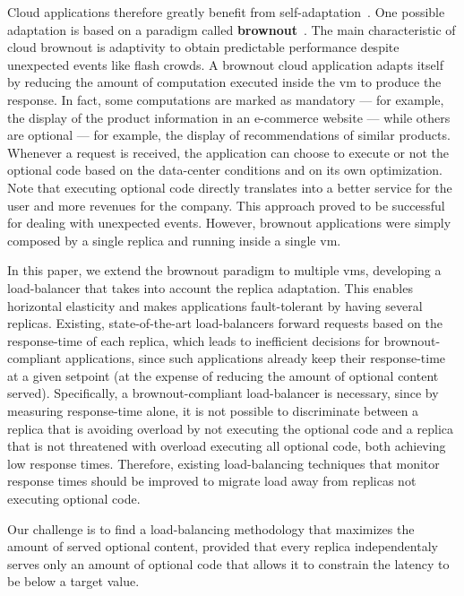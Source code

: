 Cloud applications therefore greatly benefit from
self-adaptation~\cite{SalehieSelfadaptive:TAAS}. One possible
adaptation is based on a paradigm called {\bf
  brownout}~\citep{cloudish-tr}. The main characteristic of cloud
brownout is adaptivity to obtain predictable performance despite
unexpected events like flash crowds. A brownout cloud application
adapts itself by reducing the amount of computation executed inside
the \ac{vm} to produce the response. In fact, some computations are
marked as mandatory --- for example, the display of the product
information in an e-commerce website --- while others are optional ---
for example, the display of recommendations of similar products.
Whenever a request is received, the application can choose to execute
or not the optional code based on the data-center conditions and on
its own optimization. Note that executing optional code directly
translates into a better service for the user and more revenues for
the company. This approach proved to be successful for dealing with
unexpected events. However, brownout applications were simply composed
by a single replica and running inside a single \ac{vm}.

In this paper, we extend the brownout paradigm to multiple \acp{vm},
developing a load-balancer that takes into account the replica
adaptation. This enables horizontal elasticity and makes applications
fault-tolerant by having several replicas. Existing, state-of-the-art
load-balancers forward requests based on the response-time of each
replica, which leads to inefficient decisions for brownout-compliant
applications, since such applications already keep their response-time
at a given setpoint (at the expense of reducing the amount of optional
content served). Specifically, a brownout-compliant load-balancer is
necessary, since by measuring response-time alone, it is not possible
to discriminate between a replica that is avoiding overload by not
executing the optional code and a replica that is not threatened with
overload executing all optional code, both achieving low response
times.  Therefore, existing load-balancing techniques that monitor
response times should be improved to migrate load away from replicas
not executing optional code.

Our challenge is to find a load-balancing methodology that maximizes
the amount of served optional content, provided that every replica
independentaly serves only an amount of optional code that allows it
to constrain the latency to be below a target value.

